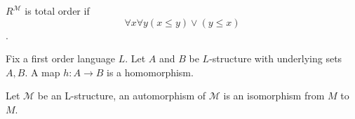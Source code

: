 \documentclass[11pt]{article}
\begin{document}
	\begin{definition}
		$R^{\mathcal{M}}$ is total order if 
		\[\forall x \forall y (x \leq y) \vee (y \leq x)\].
	\end{definition}
	
	\begin{definition}[homomorphism]
		Fix a first order language $L$. Let $A$ and $B$ be $L$-structure with underlying sets $A, B$. A map $h: A \rightarrow B$ is a homomorphism.
	\end{definition}
	
	\begin{definition}[automorphism]
		Let $\mathcal{M}$ be an L-structure, an automorphism of $\mathcal{M}$ is an isomorphism from $M$ to $M$.
	\end{definition}
\end{document}
